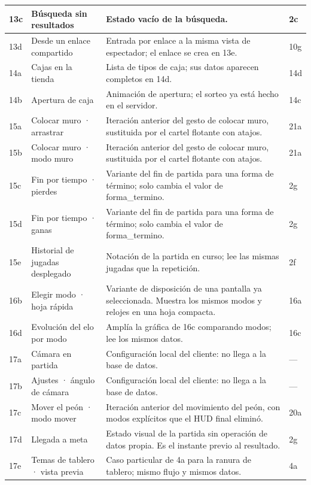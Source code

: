 \begin{center}
\begin{longtable}{|L{0.115\textwidth}|L{0.25\textwidth}|L{0.41\textwidth}|L{0.115\textwidth}|}
13c & Búsqueda sin resultados & Estado vacío de la búsqueda. & 2c \\ \hline
13d & Desde un enlace compartido & Entrada por enlace a la misma vista de espectador; el enlace se crea en 13e. & 10g \\ \hline
14a & Cajas en la tienda & Lista de tipos de caja; sus datos aparecen completos en 14d. & 14d \\ \hline
14b & Apertura de caja & Animación de apertura; el sorteo ya está hecho en el servidor. & 14c \\ \hline
15a & Colocar muro · arrastrar & Iteración anterior del gesto de colocar muro, sustituida por el cartel flotante con atajos. & 21a \\ \hline
15b & Colocar muro · modo muro & Iteración anterior del gesto de colocar muro, sustituida por el cartel flotante con atajos. & 21a \\ \hline
15c & Fin por tiempo · pierdes & Variante del fin de partida para una forma de término; solo cambia el valor de forma\_termino. & 2g \\ \hline
15d & Fin por tiempo · ganas & Variante del fin de partida para una forma de término; solo cambia el valor de forma\_termino. & 2g \\ \hline
15e & Historial de jugadas desplegado & Notación de la partida en curso; lee las mismas jugadas que la repetición. & 2f \\ \hline
16b & Elegir modo · hoja rápida & Variante de disposición de una pantalla ya seleccionada. Muestra los mismos modos y relojes en una hoja compacta. & 16a \\ \hline
16d & Evolución del elo por modo & Amplía la gráfica de 16c comparando modos; lee los mismos datos. & 16c \\ \hline
17a & Cámara en partida & Configuración local del cliente: no llega a la base de datos. & — \\ \hline
17b & Ajustes · ángulo de cámara & Configuración local del cliente: no llega a la base de datos. & — \\ \hline
17c & Mover el peón · modo mover & Iteración anterior del movimiento del peón, con modos explícitos que el HUD final eliminó. & 20a \\ \hline
17d & Llegada a meta & Estado visual de la partida sin operación de datos propia. Es el instante previo al resultado. & 2g \\ \hline
17e & Temas de tablero · vista previa & Caso particular de 4a para la ranura de tablero; mismo flujo y mismos datos. & 4a \\ \hline

\end{longtable}
\end{center}
